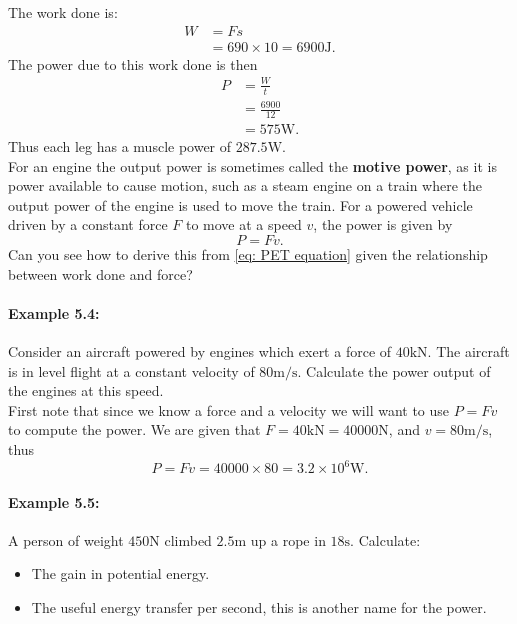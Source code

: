 The work done is:
\begin{align*}
W	&=Fs\\
	&=690\times 10=6900 \text{J}.
\end{align*}
The power due to this work done is then
\begin{align*}
P&=\frac{W}{t}\\
	&=\frac{6900}{12}\\
	&=575\text{W}.
\end{align*}
Thus each leg has a muscle power of $287.5\text{W}$.\\

For an engine the output power is sometimes called the \textbf{motive power}, as it is power available to cause motion, such as a steam engine on a train where the output power of the engine is used to move the train. For a powered vehicle driven by a constant force $F$ to move at a speed $v$, the power is given by
\begin{equation*}
P=Fv.
\end{equation*}
Can you see how to derive this from \cref{eq: PET equation} given the relationship between work done and force?

\paragraph{Example 5.4:} Consider an aircraft powered by engines which exert a force of $40\text{kN}$. The aircraft is in level flight at a constant velocity of $80\text{m/s}$. Calculate the power output of the engines at this speed.\\

First note that since we know a force and a velocity we will want to use $P=Fv$ to compute the power. We are given that $F=40\text{kN}=40000\text{N}$, and $v=80\text{m/s}$, thus
\begin{equation*}
P=Fv=40000\times 80 = 3.2\times 10^{6}\text{W}.
\end{equation*}


\paragraph{Example 5.5:} A person of weight $450\text{N}$ climbed $2.5\text{m}$ up a rope in $18\text{s}$. Calculate:
\begin{itemize}
\setlength{\itemsep}{-5pt}
    \item[a)] The gain in potential energy.
    \item[b)] The useful energy transfer per second, this is another name for the power.
\end{itemize} 

